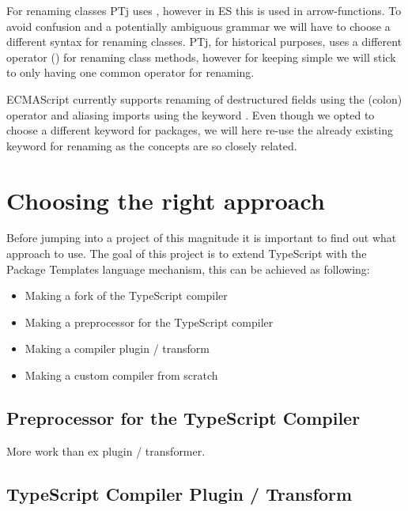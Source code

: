 For renaming classes PTj uses \codeword{=>}, however in ES this is used in arrow-functions\cite{arrowfunction}.
To avoid confusion and a potentially ambiguous grammar we will have to choose a different syntax for renaming classes.
PTj, for historical purposes, uses a different operator (\codeword{->}) for renaming class methods, however for keeping \plname{} simple we will stick to only having one common operator for renaming.

ECMAScript currently supports renaming of destructured fields using the \codeword{:}(colon) operator and aliasing imports using the keyword .
Even though we opted to choose a different keyword for packages, we will here re-use the already existing  keyword for renaming as the concepts are so closely related.



\section{Choosing the right approach}\label{sec:choosing-the-right-approach}

Before jumping into a project of this magnitude it is important to find out what approach to use. 
The goal of this project is to extend TypeScript with the Package Templates language mechanism, this can be achieved as following:

\begin{itemize}
    \item Making a fork of the TypeScript compiler
    \item Making a preprocessor for the TypeScript compiler
    \item Making a compiler plugin / transform
    \item Making a custom compiler from scratch
\end{itemize}


\subsection{Preprocessor for the TypeScript Compiler}\label{subsec:preprocessor-for-the-typescript-compiler}

More work than ex plugin / transformer.

\subsection{TypeScript Compiler Plugin / Transform}\label{subsec:typescript-compiler-plugin}

